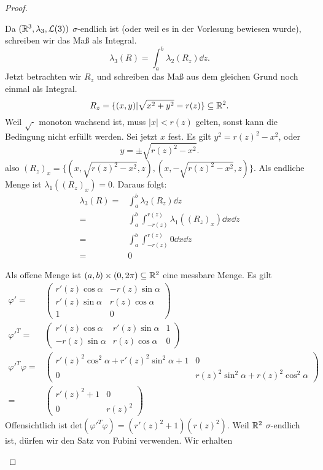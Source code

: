 \begin{proof}
\begin{parts}
	Da $(\mathbb{R}^3,\lambda_3,\mathcal{L}(3))$ $\sigma$-endlich ist (oder weil es in der Vorlesung bewiesen wurde), schreiben wir das Maß als Integral.
\[
	\lambda_3(R)=\int_a^b \lambda_2(R_z)\dd{z}
.\] 
Jetzt betrachten wir $R_z$ und schreiben das Maß aus dem gleichen Grund noch einmal als Integral.
\[
	R_z=\{(x,y)|\sqrt{x^2+y^2} =r(z)\} \subseteq \mathbb{R}^2\\
.\]
Weil $\sqrt{\cdot} $ monoton wachsend ist, muss $|x|<r(z)$ gelten, sonst kann die Bedingung nicht erfüllt werden. Sei jetzt $x$ fest. Es gilt $y^2=r(z)^2-x^2$, oder
\[
y=\pm \sqrt{r(z)^2-x^2} 
.\] 
also $(R_z)_x=\{(x,\sqrt{r(z)^2-x^2} ,z), (x,-\sqrt{r(z)^2-x^2} ,z)\} $. Als endliche Menge ist $\lambda_1((R_z)_x)=0$. Daraus folgt:
\begin{align*}
	\lambda_3(R)=&\int_a^b \lambda_2(R_z)\dd{z}\\
	=&\int_a^b \int_{-r(z)}^{r(z)} \lambda_1((R_z)_x)\dd{x}\dd{z}\\
	=&\int_a^b \int_{-r(z)}^{r(z)} 0\dd{x}\dd{z}\\
	=&0
\end{align*}
\item Als offene Menge ist $(a,b)\times (0,2\pi)\subseteq\mathbb{R}^2$ eine messbare Menge. Es gilt
	\begin{align*}
		\varphi'=&\begin{pmatrix} r'(z)\cos\alpha & -r(z)\sin\alpha \\ r'(z)\sin\alpha & r(z)\cos\alpha \\ 1 & 0 \end{pmatrix} \\
		\varphi'^T=&\begin{pmatrix} r'(z)\cos\alpha & r'(z)\sin\alpha & 1 \\ -r(z)\sin\alpha & r(z)\cos\alpha & 0 \end{pmatrix}\\
		\varphi'^T\varphi=&\begin{pmatrix} r'(z)^2\cos^2\alpha +r'(z)^2\sin^2\alpha+1 & 0 \\ 0 & r(z)^2\sin^2\alpha + r(z)^2\cos^2\alpha \end{pmatrix} \\
		=&\begin{pmatrix} r'(z)^2 + 1 & 0 \\ 0 & r(z)^2 \end{pmatrix} 
	\end{align*}
	Offensichtlich ist $\text{det}(\varphi'^T\varphi)=(r'(z)^2+1)(r(z)^2)$. Weil $\mathbb{R}^2$ $\sigma$-endlich ist, dürfen wir den Satz von Fubini verwenden. Wir erhalten 

\end{parts}
\end{proof}
